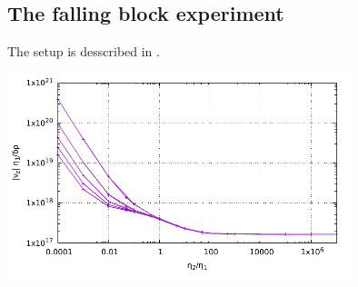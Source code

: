 

\subsection{The falling block experiment} 

The setup is desscribed in \cite{thba19}.

\includegraphics[width=10cm]{python_codes/fieldstone_22/results/case3/fallingblock.pdf}







